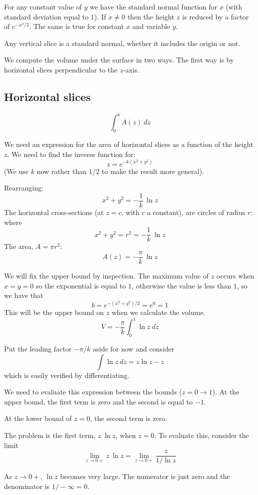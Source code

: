 \documentclass[11pt, oneside]{article}
\begin{document}
For any constant value of $y$ we have the standard normal function for $x$ (with standard deviation equal to $1$).  If $x \ne 0$ then the height $z$ is reduced by a factor of $e^{-x^2/2}$.  The same is true for constant $x$ and variable $y$.  

Any vertical slice is a standard normal, whether it includes the origin or not.

We compute the volume under the surface in two ways.  The first way is by horizontal slices perpendicular to the $z$-axis.

\subsection*{Horizontal slices}
\[ \int_0^b A(z) \ dz \]

We need an expression for the area of horizontal slices as a function of the height $z$.  We need to find the inverse function for:
\[ z = e^{-k(x^2 + y^2)} \]
(We use $k$ now rather than $1/2$ to make the result more general).

Rearranging:
\[ x^2 + y^2 = -\frac{1}{k} \ \ln z \]
The horizontal cross-sections (at $z = c$, with $c$ a constant), are circles of radius $r$: where
\[ x^2 + y^2 = r^2 = -\frac{1}{k} \ \ln z \]
The area, $A = \pi r^2$:
\[ A(z) = -\frac{\pi}{k} \ \ln z  \]

We will fix the upper bound by inspection.  The maximum value of $z$ occurs when $x=y=0$ so the exponential is equal to $1$, otherwise the value is less than $1$, so we have that 
\[  b = e^{-(x^2 + y^2)/2} = e^0 = 1 \]
This will be the upper bound on $z$ when we calculate the volume.
\[ V = -\frac{\pi}{k} \int_0^1 \ln z \ dz \]

Put the leading factor $-\pi/k$ aside for now and consider
\[ \int \ln z \ dz = z \ln z - z \]
which is easily verified by differentiating.

We need to evaluate this expression between the bounds ($z=0 \rightarrow 1$).  At the upper bound, the first term is zero and the second is equal to $-1$.

At the lower bound of $z=0$,  the second term is zero.
  
The problem is the first term, $z \ \ln z$, when $z = 0$.  To evaluate this, consider the limit
\[ \lim_{z \rightarrow 0+}  z \ \ln z = \lim_{z \rightarrow 0+}   \frac{z}{1/\ln z} \]

As $z \rightarrow 0+$, $\ln z$ becomes very large.  The numerator is just zero and the denominator is $1/-\infty = 0$.  
\end{document}
